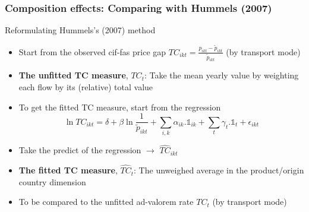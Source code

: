 \documentclass[10 pt,Helvetica, french]{beamer}
\begin{document}
\begin{frame}[label = app_compeffects_strategy]
\frametitle{Composition effects: Comparing with Hummels (2007)}
Reformulating Hummels's (2007) method  \vspace{0.1cm}
\begin{itemize}
\item Start from the observed cif-fas price gap $TC_{ikt} = \frac{p_{ikt} - \widetilde{p}_{ikt}}{\widetilde{p}_{ikt}}$ (by transport mode) \vspace{0.1cm}
\item \textbf{The unfitted TC measure}, $TC_t$: Take the mean yearly value by weighting each flow by its (relative) total value \vspace{0.1cm}
\item To get the fitted TC measure, start from the regression \vspace{0.1cm}
\footnotesize
\begin{equation}
\ln TC_{ikt} = \delta+ \beta \ln \frac{1}{\widetilde{p}_{ikt}} + \sum_{i,k}\alpha_{ik}.\mathbb{1}_{ik}+ \sum_{t}\gamma_{t}.\mathbb{1}_{t} + \epsilon_{ikt}
\label{eq:hummels}\end{equation}
\normalsize
\item Take the predict of the regression $\rightarrow$ $\widehat{TC}_{ikt}$   \vspace{0.1cm}
\item \textbf{The fitted TC measure}, $\widehat{TC}_t$: The unweighed average in the product/origin country dimension   \vspace{0.1cm}
\item To be compared to the unfitted ad-valorem rate $TC_t$ (by transport mode)

\end{itemize}


\end{frame}
\end{document}
